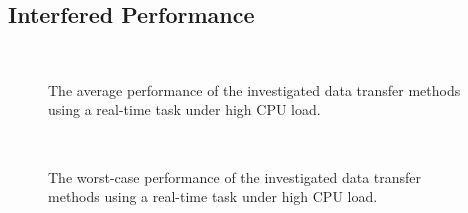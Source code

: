 \subsection{Interfered Performance}
\label{sec:interfered_performance}

\begin{figure}[!t]
 \begin{center}
  \\
  \caption{The average performance of the investigated data transfer
  methods using a real-time task under high CPU load.}
  \label{fig:average_realtime_cpuload}
 \end{center}
 \vspace{1.0em}
 \begin{center}
  \\
  \caption{The worst-case performance of the investigated data transfer
  methods using a real-time task under high CPU load.}
  \label{fig:worst_realtime_cpuload}
  \end{center}
\end{figure}

